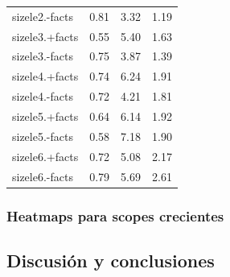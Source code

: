 \begin{minipage}{\textwidth}
\begin{tabular}{lrrr}
		sizele2.-facts	&	0.81	&	3.32	&	\cellcolor{red}1.19 \\
		sizele3.+facts	&	\cellcolor{red}0.55	&	5.40	&	1.63 \\
		sizele3.-facts	&	0.75	&	3.87	&	1.39 \\
		sizele4.+facts	&	0.74	&	6.24	&	1.91 \\
		sizele4.-facts	&	0.72	&	4.21	&	1.81 \\
		sizele5.+facts	&	0.64	&	6.14	&	1.92 \\
		sizele5.-facts	&	0.58	&	\cellcolor{green}7.18	&	1.90 \\
		sizele6.+facts	&	0.72	&	5.08	&	2.17 \\
		sizele6.-facts	&	0.79	&	5.69	&	\cellcolor{green}2.61 \\
		\bottomrule
	\end{tabular}
\end{minipage}

\subsubsection{Heatmaps para scopes crecientes}


\subsection{Discusión y conclusiones}
